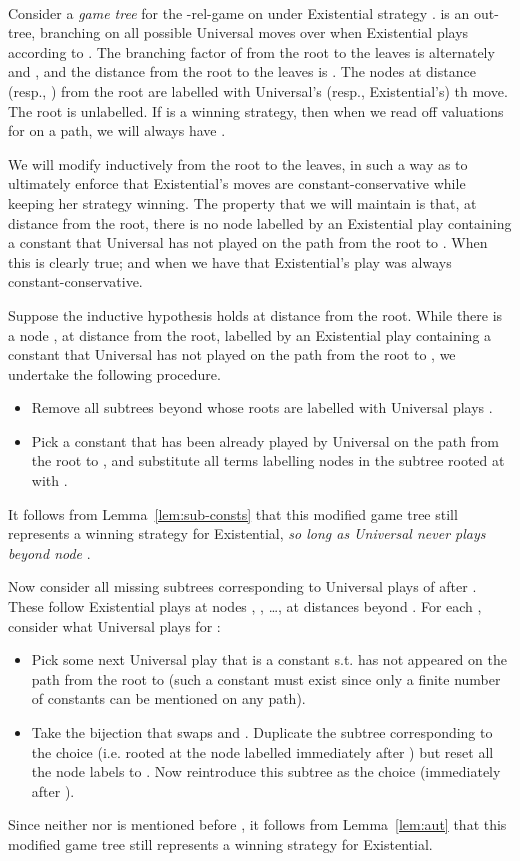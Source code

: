 \documentclass{LMCS}
\begin{document}
\paragraph{}
Consider a \emph{game tree}  for the -rel-game on  under Existential strategy .  is an out-tree, branching on all possible Universal moves over  when Existential plays according to . The branching factor of  from the root to the leaves is alternately  and , and the distance from the root to the leaves is . The nodes at distance  (resp., ) from the root are labelled with Universal's (resp., Existential's) th move. The root is unlabelled. If  is a winning strategy, then when we read off valuations for  on a path, we will always have .

We will modify  inductively from the root to the leaves, in such a way as to ultimately enforce that Existential's moves are constant-conservative while keeping her strategy winning. The property  that we will maintain is that, at distance  from the root, there is no node  labelled by an Existential play  containing a constant  that Universal has not played on the path from the root to . When  this is clearly true; and when  we have that Existential's play was always constant-conservative. 

Suppose the inductive hypothesis  holds at distance  from the root. While there is a node , at distance  from the root, labelled by an Existential play  containing a constant  that Universal has not played on the path from the root to , we undertake the following procedure.
\begin{itemize}
\item Remove all subtrees beyond  whose roots are labelled with Universal plays . 
\item Pick a constant  that has been already played by Universal on the path from the root to , and substitute all terms  labelling nodes in the subtree rooted at  with .
\end{itemize}
It follows from Lemma~\ref{lem:sub-consts} that this modified game tree still represents a winning strategy for Existential, \emph{so long as Universal never plays  beyond node }. 

Now consider all missing subtrees corresponding to Universal plays of  after . These follow Existential plays at nodes , , \ldots,  at distances  beyond . For each , consider what Universal plays for :
\begin{itemize}
\item Pick some next Universal play that is a constant  s.t.  has not appeared on the path from the root to  (such a constant must exist since only a finite number of constants can be mentioned on any path). 
\item Take the bijection  that swaps  and . Duplicate the subtree corresponding to the choice  (i.e. rooted at the node labelled  immediately after ) but reset all the node labels  to . Now reintroduce this subtree as the choice  (immediately after ). 
\end{itemize}
Since neither  nor  is mentioned before , it follows from Lemma~\ref{lem:aut} that this modified game tree still represents a winning strategy for Existential.
\end{document}
